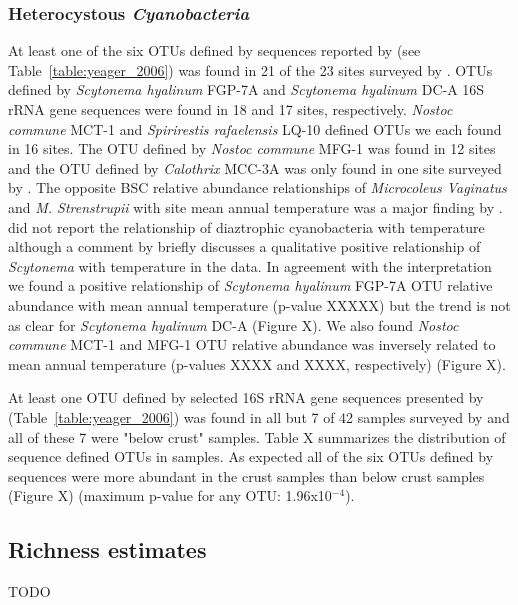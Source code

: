 \subsubsection{Heterocystous \textit{Cyanobacteria}}
At least one of the six OTUs defined by sequences reported by \citet{Yeager} (see Table~\ref{table:yeager_2006}) was found in 21 of the 23 sites surveyed by \citet{Garcia_Pichel_2013}. OTUs defined by \textit{Scytonema hyalinum} FGP-7A and \textit{Scytonema hyalinum} DC-A 16S rRNA gene sequences were found in 18 and 17 sites, respectively. \textit{Nostoc commune} MCT-1 and \textit{Spirirestis rafaelensis} LQ-10 defined OTUs we each found in 16 sites. The OTU defined by \textit{Nostoc commune} MFG-1 was found in 12 sites and the OTU defined by \textit{Calothrix} MCC-3A was only found in one site surveyed by \citet{Garcia_Pichel_2013}. The opposite BSC relative abundance relationships of \textit{Microcoleus Vaginatus} and \textit{M. Strenstrupii} with site mean annual temperature was a major finding by \citet{Garcia_Pichel_2013}. \citet{Garcia_Pichel_2013} did not report the relationship of diaztrophic cyanobacteria with temperature although a comment by \citet{Belnap28062013} briefly discusses a qualitative positive relationship of \textit{Scytonema} with temperature in the \citet{Garcia_Pichel_2013} data. In agreement with the \citet{Belnap28062013} interpretation we found a positive relationship of \textit{Scytonema hyalinum} FGP-7A OTU relative abundance with mean annual temperature (p-value XXXXX) but the trend is not as clear for \textit{Scytonema hyalinum} DC-A (Figure X). We also found \textit{Nostoc commune} MCT-1 and MFG-1 OTU relative abundance was inversely related to mean annual temperature (p-values XXXX and XXXX, respectively) (Figure X). 

At least one OTU defined by selected 16S rRNA gene sequences presented by \citet{Yeager} (Table~\ref{table:yeager_2006}) was found in all but 7 of 42 samples surveyed by \citet{Steven_2013} and all of these 7 were "below crust" samples. Table X summarizes the distribution of \citet{Yeager} sequence defined OTUs in \citet{Steven_2013} samples. As expected all of the six OTUs defined by \citet{Yeager} sequences were more abundant in the crust samples than below crust samples (Figure X) (maximum p-value for any OTU: 1.96x10$^{-4}$).

\subsection{Richness estimates}
TODO